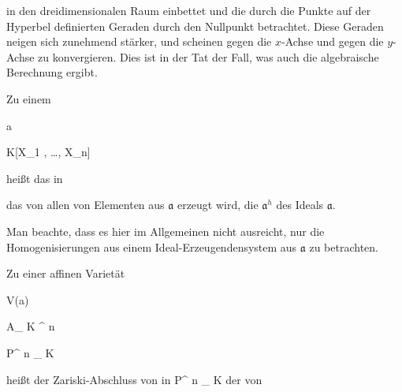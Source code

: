  in den dreidimensionalen Raum einbettet und die durch die Punkte auf der Hyperbel definierten Geraden durch den Nullpunkt betrachtet. Diese Geraden neigen sich zunehmend stärker, und scheinen gegen die $x$-Achse und gegen die $y$-Achse zu konvergieren. Dies ist in der Tat der Fall, was auch die algebraische Berechnung ergibt.



{}

{


Zu einem


\mavergleichskette

{\vergleichskette

{ {\mathfrak a}
}

{ \subseteq }{ K[X_1 , \ldots , X_n]
}

{  }{
}

{    }{
}

{   }{
}

}
{}{}{}
heißt das
in

 das von allen
von Elementen aus ${\mathfrak a}$ erzeugt wird, die  ${\mathfrak a}^h$ des Ideals ${\mathfrak a}$.


}


Man beachte, dass es hier im Allgemeinen nicht ausreicht, nur die Homogenisierungen aus einem Ideal-Erzeugendensystem aus ${\mathfrak a}$ zu betrachten.



{}

{


Zu einer affinen Varietät


\mavergleichskette

{\vergleichskette

{ V({\mathfrak a})
}

{ \subseteq }{ { {\mathbb A}_{  K }^{  n   } }
}

{ \subseteq }{ {\mathbb P}^{ n }_{ K}
}

{    }{
}

{   }{
}

}
{}{}{}
heißt der Zariski-Abschluss von   {  in  }  {  {\mathbb P}^{ n }_{ K}   }{ } der  von



}



